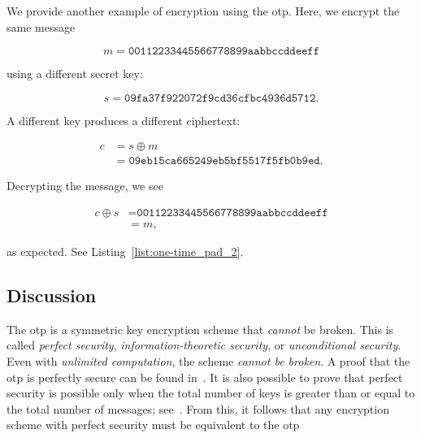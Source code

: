 \begin{example}

We provide another example of encryption using the \gls{otp}.
Here, we encrypt the same message

\begin{equation}
    m = \texttt{00112233445566778899aabbccddeeff}
\end{equation}

\noindent
using a different secret key:

\begin{equation}
    s = \texttt{09fa37f922072f9cd36cfbc4936d5712}.
\end{equation}

\noindent
A different key produces a different ciphertext:

\begin{align}
    c &= s \oplus m \nonumber\\
        &= \texttt{09eb15ca665249eb5bf5517f5fb0b9ed}.
\end{align}

\noindent
Decrypting the message, we see

\begin{align}
    c \oplus s &= \texttt{00112233445566778899aabbccddeeff} \nonumber\\
        &= m,
\end{align}

\noindent
as expected.
See Listing~\ref{list:one-time_pad_2}.


\end{example}

\subsection{Discussion}

The \gls{otp} is a \gls{symmetric key encryption} scheme that
\emph{cannot} be broken.
This is called \emph{\gls{perfect security}},
\emph{information-theoretic security},
or \emph{unconditional security}.
Even with \emph{unlimited computation}, the scheme \emph{cannot be broken}.
A proof that the \gls{otp} is perfectly secure can be found
in~\cite[Theorem 2.10]{IntroModernCrypto}.
It is also possible to prove that \gls{perfect security} is possible
only when the total number of keys is greater than or equal
to the total number of messages;
see~\cite[Theorem 2.11]{IntroModernCrypto}.
From this, it follows that any \gls{encryption scheme}
with \gls{perfect security}
must be equivalent to the \gls{otp}

